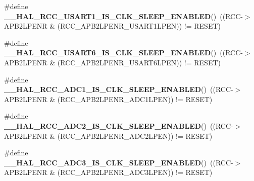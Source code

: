 \begin{DoxyCompactItemize}
\item 
\mbox{\label{group___r_c_c___clock___sleep___enable___disable___status_ga1059a391a514543547809a524b4cdf0d}} 
\#define {\bfseries \+\_\+\+\_\+\+H\+A\+L\+\_\+\+R\+C\+C\+\_\+\+U\+S\+A\+R\+T1\+\_\+\+I\+S\+\_\+\+C\+L\+K\+\_\+\+S\+L\+E\+E\+P\+\_\+\+E\+N\+A\+B\+L\+ED}()~((R\+CC-\/$>$A\+P\+B2\+L\+P\+E\+NR \& (R\+C\+C\+\_\+\+A\+P\+B2\+L\+P\+E\+N\+R\+\_\+\+U\+S\+A\+R\+T1\+L\+P\+EN)) != R\+E\+S\+ET)
\item 
\mbox{\label{group___r_c_c___clock___sleep___enable___disable___status_ga7699273dbae6749ce8debf9971c72ffc}} 
\#define {\bfseries \+\_\+\+\_\+\+H\+A\+L\+\_\+\+R\+C\+C\+\_\+\+U\+S\+A\+R\+T6\+\_\+\+I\+S\+\_\+\+C\+L\+K\+\_\+\+S\+L\+E\+E\+P\+\_\+\+E\+N\+A\+B\+L\+ED}()~((R\+CC-\/$>$A\+P\+B2\+L\+P\+E\+NR \& (R\+C\+C\+\_\+\+A\+P\+B2\+L\+P\+E\+N\+R\+\_\+\+U\+S\+A\+R\+T6\+L\+P\+EN)) != R\+E\+S\+ET)
\item 
\mbox{\label{group___r_c_c___clock___sleep___enable___disable___status_gaf477ab254684bdedec1dd28ddd7585ed}} 
\#define {\bfseries \+\_\+\+\_\+\+H\+A\+L\+\_\+\+R\+C\+C\+\_\+\+A\+D\+C1\+\_\+\+I\+S\+\_\+\+C\+L\+K\+\_\+\+S\+L\+E\+E\+P\+\_\+\+E\+N\+A\+B\+L\+ED}()~((R\+CC-\/$>$A\+P\+B2\+L\+P\+E\+NR \& (R\+C\+C\+\_\+\+A\+P\+B2\+L\+P\+E\+N\+R\+\_\+\+A\+D\+C1\+L\+P\+EN)) != R\+E\+S\+ET)
\item 
\mbox{\label{group___r_c_c___clock___sleep___enable___disable___status_ga095fae973278057aca5c989eb325ac61}} 
\#define {\bfseries \+\_\+\+\_\+\+H\+A\+L\+\_\+\+R\+C\+C\+\_\+\+A\+D\+C2\+\_\+\+I\+S\+\_\+\+C\+L\+K\+\_\+\+S\+L\+E\+E\+P\+\_\+\+E\+N\+A\+B\+L\+ED}()~((R\+CC-\/$>$A\+P\+B2\+L\+P\+E\+NR \& (R\+C\+C\+\_\+\+A\+P\+B2\+L\+P\+E\+N\+R\+\_\+\+A\+D\+C2\+L\+P\+EN)) != R\+E\+S\+ET)
\item 
\mbox{\label{group___r_c_c___clock___sleep___enable___disable___status_gadbde7fb4a644ed42f33f415902711d6b}} 
\#define {\bfseries \+\_\+\+\_\+\+H\+A\+L\+\_\+\+R\+C\+C\+\_\+\+A\+D\+C3\+\_\+\+I\+S\+\_\+\+C\+L\+K\+\_\+\+S\+L\+E\+E\+P\+\_\+\+E\+N\+A\+B\+L\+ED}()~((R\+CC-\/$>$A\+P\+B2\+L\+P\+E\+NR \& (R\+C\+C\+\_\+\+A\+P\+B2\+L\+P\+E\+N\+R\+\_\+\+A\+D\+C3\+L\+P\+EN)) != R\+E\+S\+ET)

\end{DoxyCompactItemize}
